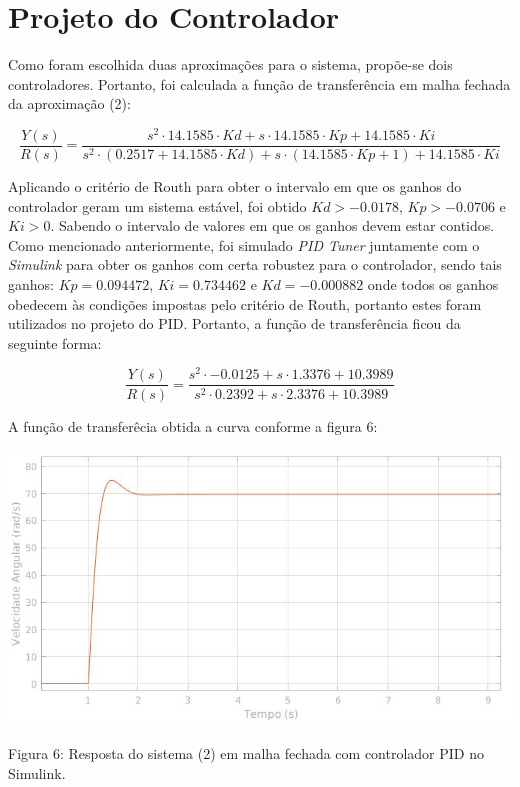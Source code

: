 \documentclass{article}
\begin{document}
\section{Projeto do Controlador}
Como foram escolhida duas aproximações para o sistema, propõe-se dois controladores. Portanto, foi calculada a função de transferência em malha fechada da aproximação (2):

\begin{equation}
    \frac{Y(s)}{R(s)} = \frac{s^{2\!} \cdot {14.1585 \cdot Kd} + s \cdot {14.1585 \cdot Kp} + {14.1585 \cdot Ki}}{s^{2\!} \cdot {(0.2517+14.1585 \cdot Kd)} + s \cdot {(14.1585 \cdot Kp + 1)} + {14.1585 \cdot Ki}}
    \end{equation}
    
    Aplicando o critério de Routh para obter o intervalo em que os ganhos do controlador geram um sistema estável, foi obtido $Kd > -0.0178$, $Kp > -0.0706$ e $Ki > 0$. Sabendo o intervalo de valores em que os ganhos devem estar contidos. Como mencionado anteriormente, foi simulado \textit{PID Tuner} juntamente com o \textit{Simulink} para obter os ganhos com certa robustez para o controlador, sendo tais ganhos: $Kp = 0.094472$, $Ki = 0.734462$ e $Kd = -0.000882$ onde todos os ganhos obedecem às condições impostas pelo critério de Routh, portanto estes foram utilizados no projeto do PID. Portanto, a função de transferência ficou da seguinte forma:
    
    \begin{equation}
    \frac{Y(s)}{R(s)} = \frac{s^{2\!} \cdot {-0.0125} + s \cdot {1.3376} + {10.3989}}{s^{2\!} \cdot {0.2392} + s \cdot {2.3376} + {10.3989}}
    \end{equation}
    
    A função de transferêcia obtida a curva conforme a figura 6:
    
    \begin{center}
    \centering
        \includegraphics[scale=0.5]{imagens/PID2Param.jpg}
        
        \caption{Figura 6: Resposta do sistema (2) em malha fechada com controlador PID no Simulink.}
    \end{center}
    
\end{document}

